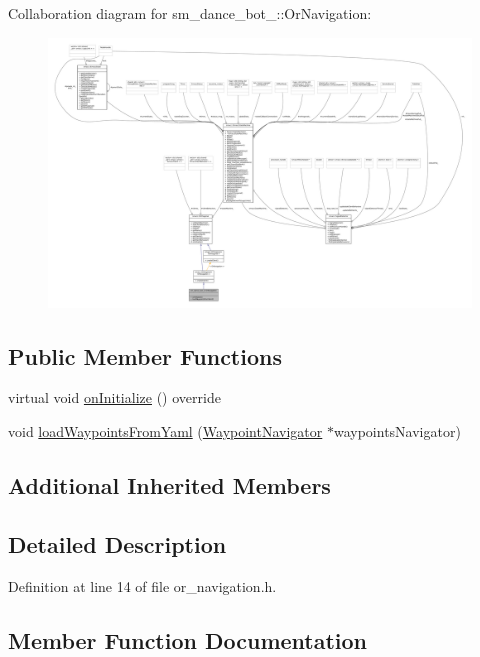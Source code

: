 Collaboration diagram for sm\+\_\+dance\+\_\+bot\+\_\+:\+:Or\+Navigation\+:
\nopagebreak
\begin{figure}[H]
\begin{center}
\leavevmode
\includegraphics[width=350pt]{classsm__dance__bot__2_1_1OrNavigation__coll__graph}
\end{center}
\end{figure}
\subsection*{Public Member Functions}
\begin{DoxyCompactItemize}
\item 
virtual void \hyperlink{classsm__dance__bot__2_1_1OrNavigation_acc491d801e0abacd9d152e048e77fab6}{on\+Initialize} () override
\item 
void \hyperlink{classsm__dance__bot__2_1_1OrNavigation_a663fc206de1964058c851f521279ca34}{load\+Waypoints\+From\+Yaml} (\hyperlink{classmove__base__z__client_1_1WaypointNavigator}{Waypoint\+Navigator} $\ast$waypoints\+Navigator)
\end{DoxyCompactItemize}
\subsection*{Additional Inherited Members}


\subsection{Detailed Description}


Definition at line 14 of file or\+\_\+navigation.\+h.



\subsection{Member Function Documentation}
